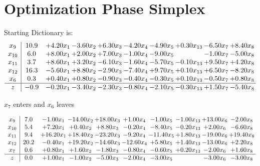 \documentclass[9pt]{article}
\begin{document}
\section{Optimization Phase Simplex}
Starting Dictionary is:
\[\begin{array}{c| c c@{\hskip 2pt} c@{\hskip 2pt} c@{\hskip 2pt} c@{\hskip 2pt} c@{\hskip 2pt} c@{\hskip 2pt} c@{\hskip 2pt} c@{\hskip 2pt} }
 x_{9}   &  10.9 & +  4.20 x_{1} & -3.60 x_{2} & +  6.30 x_{3} & -4.20 x_{4} & -4.90 x_{5} & +  0.30 x_{13} & -6.50 x_{7} & +  8.40 x_{8}\\
 x_{10}   &  6.0 & +  8.00 x_{1} & +  2.00 x_{2} & +  7.00 x_{3} & -1.00 x_{4} & -9.00 x_{5} &   & -1.00 x_{7} & -5.00 x_{8}\\
 x_{11}   &  3.7 & +  8.60 x_{1} & +  3.20 x_{2} & -6.10 x_{3} & -1.60 x_{4} & -5.70 x_{5} & -0.10 x_{13} & +  9.50 x_{7} & +  4.20 x_{8}\\
 x_{12}   &  16.3 & -5.60 x_{1} & +  8.80 x_{2} & -2.90 x_{3} & -7.40 x_{4} & +  9.70 x_{5} & +  0.10 x_{13} & +  6.50 x_{7} & -8.20 x_{8}\\
 x_{6}   &  0.3 & +  0.40 x_{1} & +  0.80 x_{2} & -0.90 x_{3} & -0.40 x_{4} & -0.30 x_{5} & +  0.10 x_{13} & -0.50 x_{7} & +  0.80 x_{8}\\
\hline
z    &  -0.9 & -0.20 x_{1} & -3.40 x_{2} & -2.30 x_{3} & -0.80 x_{4} & -2.10 x_{5} & -0.30 x_{13} & +  1.50 x_{7} & -5.40 x_{8}\\
\end{array}\]


 $ x_{7} $ enters and $ x_{6} $ leaves 

 \[\begin{array}{c| c c@{\hskip 2pt} c@{\hskip 2pt} c@{\hskip 2pt} c@{\hskip 2pt} c@{\hskip 2pt} c@{\hskip 2pt} c@{\hskip 2pt} c@{\hskip 2pt} }
 x_{9}   &  7.0 & -1.00 x_{1} & -14.00 x_{2} & + 18.00 x_{3} & +  1.00 x_{4} & -1.00 x_{5} & -1.00 x_{13} & + 13.00 x_{6} & -2.00 x_{8}\\
 x_{10}   &  5.4 & +  7.20 x_{1} & +  0.40 x_{2} & +  8.80 x_{3} & -0.20 x_{4} & -8.40 x_{5} & -0.20 x_{13} & +  2.00 x_{6} & -6.60 x_{8}\\
 x_{11}   &  9.4 & + 16.20 x_{1} & + 18.40 x_{2} & -23.20 x_{3} & -9.20 x_{4} & -11.40 x_{5} & +  1.80 x_{13} & -19.00 x_{6} & + 19.40 x_{8}\\
 x_{12}   &  20.2 & -0.40 x_{1} & + 19.20 x_{2} & -14.60 x_{3} & -12.60 x_{4} & +  5.80 x_{5} & +  1.40 x_{13} & -13.00 x_{6} & +  2.20 x_{8}\\
 x_{7}   &  0.6 & +  0.80 x_{1} & +  1.60 x_{2} & -1.80 x_{3} & -0.80 x_{4} & -0.60 x_{5} & +  0.20 x_{13} & -2.00 x_{6} & +  1.60 x_{8}\\
\hline
z    &  0.0 & +  1.00 x_{1} & -1.00 x_{2} & -5.00 x_{3} & -2.00 x_{4} & -3.00 x_{5} &   & -3.00 x_{6} & -3.00 x_{8}\\
\end{array}\]
\end{document}
